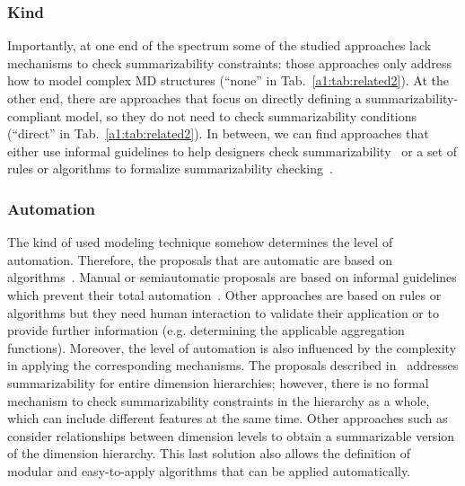 \subsubsection{Kind}
Importantly, at one end of the spectrum some of the studied
approaches lack mechanisms to check summarizability constraints:
those approaches only address how to model complex MD structures
(``none'' in Tab.~\ref{a1:tab:related2}). At the other end, there
are approaches that focus on directly defining a
summarizability-compliant model, so they do not need to check
summarizability conditions (``direct'' in
Tab.~\ref{a1:tab:related2}). In between, we can find approaches that
either use informal guidelines to help designers check
summarizability~\cite{DBLP:journals/dke/MalinowskiZ06} or a set of
rules or algorithms to formalize summarizability
checking~\cite{DBLP:conf/dmdw/HusemannLV00,DBLP:journals/is/PedersenJD01,MansmannIJDWDM07,DBLP:journals/dss/PratAC06,DBLP:journals/tods/HurtadoGM05}.

\subsubsection{Automation}
The kind of used modeling technique somehow determines the level of
automation. Therefore, the proposals that are automatic are based on
algorithms~\cite{DBLP:journals/is/PedersenJD01,DBLP:journals/tods/HurtadoGM05,DBLP:conf/dmdw/HusemannLV00}.
Manual or semiautomatic proposals are based on informal guidelines
which prevent their total
automation~\cite{DBLP:journals/dke/MalinowskiZ06}. Other approaches
are based on rules \cite{DBLP:journals/dss/PratAC06} or algorithms
\cite{MansmannIJDWDM07} but they need human interaction to validate
their application or to provide further information (e.g.
determining the applicable aggregation functions). Moreover, the
level of automation is also influenced by the complexity in applying
the corresponding mechanisms. The proposals described
in~\cite{DBLP:journals/dke/MalinowskiZ06,MansmannIJDWDM07} addresses
summarizability for entire dimension hierarchies; however, there is
 no formal mechanism to check summarizability constraints in the hierarchy as
 a whole, which can include different features at the same time.
Other approaches such
as~\cite{DBLP:journals/is/PedersenJD01,DBLP:journals/tods/HurtadoGM05}
consider relationships between dimension levels to obtain a
summarizable version of the dimension hierarchy. This last solution
also allows the definition of modular and easy-to-apply algorithms
that can be applied automatically.

